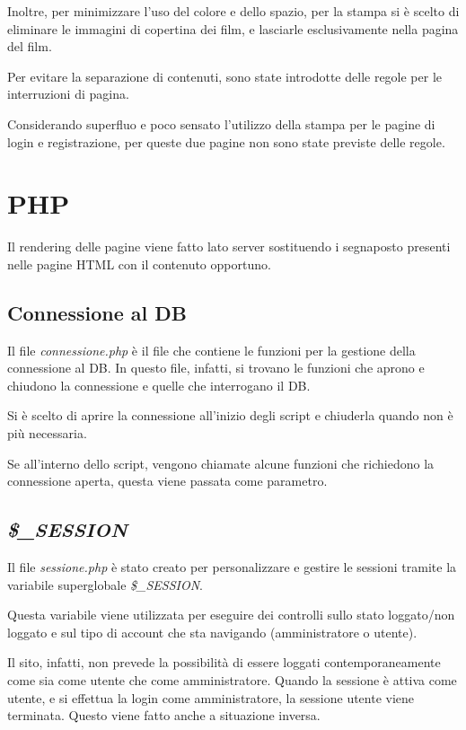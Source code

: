 \documentclass[a4paper]{article}
\begin{document}
Inoltre, per minimizzare l'uso del colore e dello spazio, per la stampa si è scelto di eliminare le immagini di copertina dei film, e lasciarle esclusivamente nella pagina del film.

Per evitare la separazione di contenuti, sono state introdotte delle regole per le interruzioni di pagina.

Considerando superfluo e poco sensato l'utilizzo della stampa per le pagine di login e registrazione, per queste due pagine non sono state previste delle regole.

\section{PHP}
Il rendering delle pagine viene fatto lato server sostituendo i segnaposto presenti nelle pagine HTML
con il contenuto opportuno.

\subsection{Connessione al DB}
Il file \textit{connessione.php} è il file che contiene le funzioni per la gestione della connessione al DB.
In questo file, infatti, si trovano le funzioni che aprono e chiudono la connessione e quelle che interrogano il DB.

Si è scelto di aprire la connessione all'inizio degli script e chiuderla quando non è più necessaria.

Se all'interno dello script, vengono chiamate alcune funzioni che richiedono la connessione aperta, questa viene passata come parametro. 

\subsection{\textit{\$\_SESSION}}
Il file \textit{sessione.php} è stato creato per personalizzare e gestire le sessioni tramite la variabile superglobale \textit{\$\_SESSION}.

Questa variabile viene utilizzata per eseguire dei controlli sullo stato loggato/non loggato e sul tipo di account che sta navigando (amministratore o utente).

Il sito, infatti, non prevede la possibilità di essere loggati contemporaneamente come sia come utente che come amministratore.
Quando la sessione è attiva come utente, e si effettua la login come amministratore, la sessione utente viene terminata. Questo viene fatto anche a situazione inversa.
\end{document}
